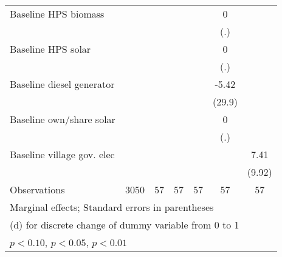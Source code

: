 \begin{table}[htbp]
\begin{tabular*}{1\hsize}{@{\hskip\tabcolsep\extracolsep\fill}l*{6}{c}}
Baseline HPS biomass&                  &                  &                  &                  &        0         &                  \\
                &                  &                  &                  &                  &      (.)         &                  \\
Baseline HPS solar&                  &                  &                  &                  &        0         &                  \\
                &                  &                  &                  &                  &      (.)         &                  \\
Baseline diesel generator&                  &                  &                  &                  &    -5.42         &                  \\
                &                  &                  &                  &                  &   (29.9)         &                  \\
Baseline own/share solar&                  &                  &                  &                  &        0         &                  \\
                &                  &                  &                  &                  &      (.)         &                  \\
Baseline village gov. elec&                  &                  &                  &                  &                  &     7.41         \\
                &                  &                  &                  &                  &                  &   (9.92)         \\
\midrule
Observations    &     3050         &       57         &       57         &       57         &       57         &       57         \\
\bottomrule
\multicolumn{7}{l}{\footnotesize Marginal effects; Standard errors in parentheses}\\
\multicolumn{7}{l}{\footnotesize  (d) for discrete change of dummy variable from 0 to 1}\\
\multicolumn{7}{l}{\footnotesize \sym{*} \(p<0.10\), \sym{**} \(p<0.05\), \sym{***} \(p<0.01\)}\\
\end{tabular*}
\end{table}
